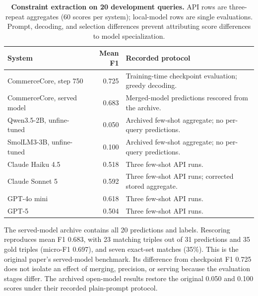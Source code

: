 \begin{table}[htbp]
\centering\small
\caption{\textbf{Constraint extraction on 20 development queries.} API rows are three-repeat aggregates (60 scores per system); local-model rows are single evaluations. Prompt, decoding, and selection differences prevent attributing score differences to model specialization.}
\label{tab:constraint-benchmark}
\begin{tabularx}{\linewidth}{@{}lr>{\raggedright\arraybackslash}X@{}}
\toprule
System & Mean F1 & Recorded protocol \\
\midrule
CommerceCore, step 750 & 0.725 & Training-time checkpoint evaluation; greedy decoding. \\
CommerceCore, served model & 0.683 & Merged-model predictions rescored from the archive. \\
Qwen3.5-2B, unfine-tuned & 0.050 & Archived few-shot aggregate; no per-query predictions. \\
SmolLM3-3B, unfine-tuned & 0.100 & Archived few-shot aggregate; no per-query predictions. \\
\midrule
Claude Haiku 4.5 & 0.518 & Three few-shot API runs. \\
Claude Sonnet 5 & 0.592 & Three few-shot API runs; corrected stored aggregate. \\
GPT-4o mini & 0.618 & Three few-shot API runs. \\
GPT-5 & 0.504 & Three few-shot API runs. \\
\bottomrule
\end{tabularx}
\end{table}

The served-model archive contains all 20 predictions and labels. Rescoring reproduces mean F1 0.683, with 23 matching triples out of 31 predictions and 35 gold triples (micro-F1 0.697), and seven exact-set matches (35\%). This is the original paper's served-model benchmark. Its difference from checkpoint F1 0.725 does not isolate an effect of merging, precision, or serving because the evaluation stages differ. The archived open-model results restore the original 0.050 and 0.100 scores under their recorded plain-prompt protocol.


